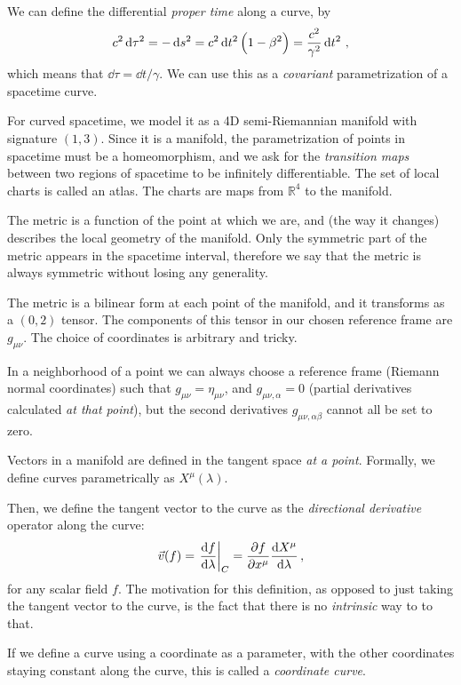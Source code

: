 \documentclass[main.tex]{subfiles}
\begin{document}
We can define the differential \emph{proper time} along a curve, by 
%
\begin{align}
c^2 \dd{\tau^2}  = - \dd{s^2} = c^2 \dd{t^2} \qty(1 - \beta^2) = \frac{c^2}{\gamma^2} \dd{t^2}
\,,
\end{align}
%
which means that \(\dd{\tau } = \dd{t} / \gamma \). 
We can use this as a \emph{covariant} parametrization of a spacetime curve. 

For curved spacetime, we model it as a 4D semi-Riemannian manifold with signature \((1, 3)\). 
Since it is a manifold, the parametrization of points in spacetime must be a homeomorphism, and we ask for the \emph{transition maps} between two regions of spacetime to be infinitely differentiable. 
The set of local charts is called an atlas. 
The charts are maps from \(\mathbb{R}^{4}\) to the manifold. 

The metric is a function of the point at which we are, and (the way it changes) describes the local geometry of the manifold. 
Only the symmetric part of the  metric appears in the spacetime interval, therefore we say that the metric is always symmetric without losing any generality. 

The metric is a bilinear form at each point of the manifold, and it transforms as a \((0,2)\) tensor. 
The components of this tensor in our chosen reference frame are \(g_{\mu \nu }\). 
The choice of coordinates is arbitrary and tricky. 

In a neighborhood of a point we can always choose a reference frame (Riemann normal coordinates) such that \(g_{\mu \nu } = \eta_{\mu \nu }\), and \(g_{\mu \nu , \alpha } = 0\) (partial derivatives calculated \emph{at that point}), but the second derivatives \(g_{\mu \nu , \alpha \beta }\) cannot all be set to zero. 

Vectors in a manifold are defined in the tangent space \emph{at a point}. 
Formally, we define curves parametrically as \(X^{\mu }(\lambda )\). 

Then, we define the tangent vector to the curve as the \emph{directional derivative} operator along the curve: 
%
\begin{align}
\vec{v} (f) = \eval{\dv{f}{\lambda }}_{C} = \pdv{f}{x^{\mu }} \dv{X^{\mu }}{\lambda }
\,,
\end{align}
%
for any scalar field \(f\). The motivation for this definition, as opposed to just taking the tangent vector to the curve, is the fact that there is no \emph{intrinsic} way to to that. 

If we define a curve using a coordinate as a parameter, with the other coordinates staying constant along the curve, this is called a \emph{coordinate curve}. 
\end{document}
